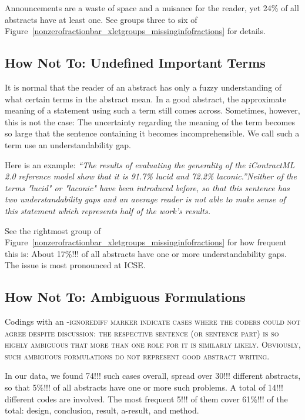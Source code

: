 \documentclass[10pt,journal,compsoc]{IEEEtran}
\newcommand{\Cb}[1]{\bgroup\scshape #1\egroup}  %
\newcommand{\Quote}[1]{\bgroup\itshape ``#1''\egroup}  %
\begin{document}
Announcements are a waste of space and a nuisance for the reader, 
yet 24\% of all abstracts have at least one.
See groups three to six of Figure~\ref{nonzerofractionbar_xletgroups_missinginfofractions} 
for details.


\subsection{How Not To: Undefined Important Terms}

It is normal that the reader of an abstract has only a fuzzy understanding
of what certain terms in the abstract mean.
In a good abstract, the approximate meaning of a statement using such a term
still comes across.
Sometimes, however, this is not the case: 
The uncertainty regarding the meaning of the term becomes so large
that the sentence containing it becomes incomprehensible.
We call such a term use an understandability gap.

Here is an example:
\Quote{The results of evaluating the generality of the iContractML 2.0 reference model show 
  that it is 91.7\% lucid and 72.2\% laconic.} [HamMetQas22]
Neither of the terms "lucid" or "laconic" have been introduced before, so that
this sentence has two understandability gaps and
an average reader is not able to make sense of this statement
which represents half of the work's results.

See the rightmost group of Figure~\ref{nonzerofractionbar_xletgroups_missinginfofractions} 
for how frequent this is:  
About 17\%!!! of all abstracts have one or more understandability gaps.
The issue is most pronounced at ICSE.


\subsection{How Not To: Ambiguous Formulations}

Codings with an \Cb{-ignorediff} marker indicate cases where the coders could not agree
despite discussion: the respective sentence (or sentence part) is so highly ambiguous that
more than one role for it is similarly likely.
Obviously, such ambiguous formulations do not represent good abstract writing.

In our data, we found 74!!! such cases overall, spread over 30!!! different abstracts,
so that 5\%!!! of all abstracts have one or more such problems.
A total of 14!!! different codes are involved.
The most frequent 5!!! of them cover 61\%!!! of the total:
design, conclusion, result, a-result, and method.
\end{document}
